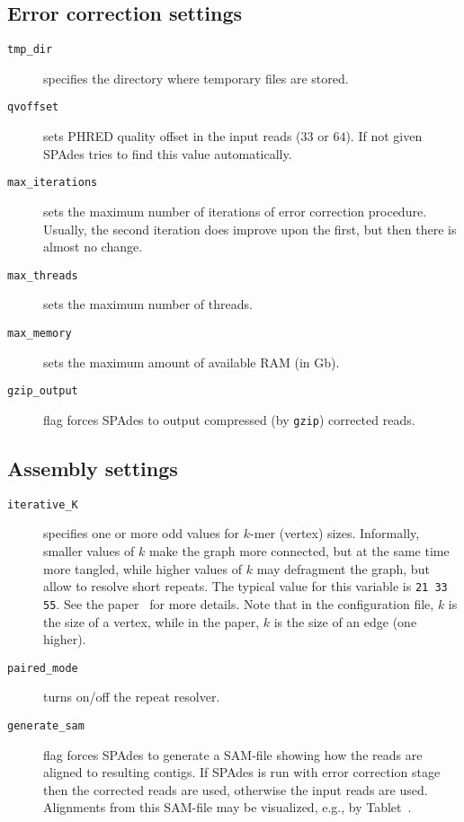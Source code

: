 \documentclass{article}
\def\spades{SPAdes}
\begin{document}
\subsection{Error correction settings}
\begin{description}
\item[{\tt tmp\_dir}] specifies the directory where temporary files are stored.
\item[{\tt qvoffset}] sets PHRED quality offset in the input reads ($33$ or $64$). If not given {\spades} tries to find this value automatically.
\item[{\tt max\_iterations}] sets the maximum number of iterations
of error correction procedure. Usually, the second iteration does improve upon the first, but then there is almost no change.
\item[{\tt max\_threads}] sets the maximum number of threads.
\item[{\tt max\_memory}] sets the maximum amount of available RAM (in Gb).
\item[{\tt gzip\_output}] flag forces {\spades} to output compressed (by {\tt gzip})
corrected reads.
\end{description}

\subsection{Assembly settings}\label{subsec:assembly}
\begin{description}
\item[{\tt iterative\_K}] specifies one or more odd values for $k$-mer (vertex) sizes.  Informally, smaller values of $k$ make the graph more connected, but at the same time more tangled, while higher values of $k$ may defragment the graph, but allow to resolve short repeats. The typical value for this variable is {\tt 21 33 55}. See the paper~\cite{main} for more details.  Note that in the configuration file, $k$ is the size of a vertex, while in the paper, $k$ is the size of an edge (one higher).

\item[{\tt paired\_mode}] turns on/off the repeat resolver.

\item[{\tt generate\_sam}] flag forces {\spades} to generate a SAM-file
showing how the reads are aligned to resulting contigs. If {\spades}
is run with error correction stage then the corrected reads are used,
otherwise the input reads are used. Alignments from this SAM-file
may be visualized, e.g., by Tablet~\cite{tablet}.
\end{description}
\end{document}
